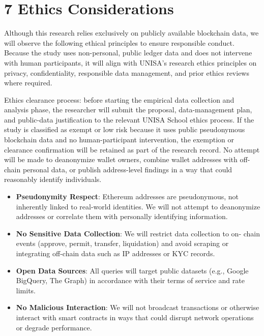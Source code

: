 \clearpage
{}
\section*{7 \textbf{Ethics Considerations}}
\label{sec:ethics-considerations}

Although this research relies exclusively on publicly available blockchain data, we will observe the following ethical principles to ensure responsible conduct. Because the study uses non-personal, public ledger data and does not intervene with human participants, it will align with UNISA's research ethics principles on privacy, confidentiality, responsible data management, and prior ethics reviews where required.


Ethics clearance process: before starting the empirical data collection and analysis phase, the researcher will submit the proposal, data-management plan, and public-data justification to the relevant UNISA School ethics process. If the study is classified as exempt or low risk because it uses public pseudonymous blockchain data and no human-participant intervention, the exemption or clearance confirmation will be retained as part of the research record. No attempt will be made to deanonymize wallet owners, combine wallet addresses with off-chain personal data, or publish address-level findings in a way that could reasonably identify individuals.



\begin{itemize}
\item[\textbullet] \textbf{Pseudonymity Respect}: Ethereum addresses are pseudonymous, not inherently linked to real-world identities. We will not attempt to deanonymize addresses or correlate them with personally identifying information.
\item[\textbullet] \textbf{No Sensitive Data Collection}: We will restrict data collection to on- chain events (approve, permit, transfer, liquidation) and avoid scraping or integrating off-chain data such as IP addresses or KYC records.
\end{itemize}

\begin{itemize}
\item[\textbullet] \textbf{Open Data Sources}: All queries will target public datasets (e.g., Google BigQuery, The Graph) in accordance with their terms of service and rate limits.
\item[\textbullet] \textbf{No Malicious Interaction}: We will not broadcast transactions or otherwise interact with smart contracts in ways that could disrupt network operations or degrade performance.
\end{itemize}

